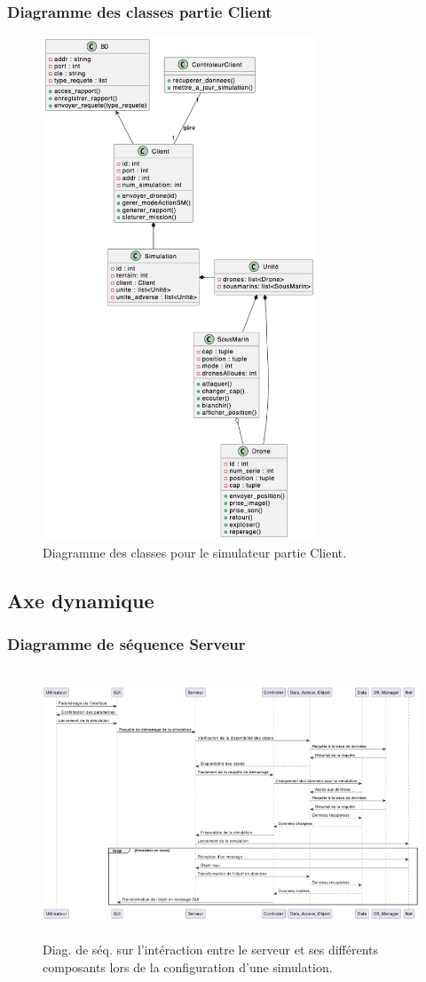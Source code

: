 \subsubsection{Diagramme des classes partie Client}
\begin{figure}[H]
	\centering
	\includegraphics[height=15cm]{img/client.png} 
	\caption{Diagramme des classes pour le simulateur partie Client.}
\end{figure}


\subsection{Axe dynamique}
\subsubsection{Diagramme de séquence Serveur}

\begin{figure}[H]
	\centering
	\includegraphics[height=8cm]{img/SeqServeur.png} 
	\caption{Diag. de séq. sur l'intéraction entre le serveur et ses différents composants lors de la configuration d'une simulation.}
\end{figure}

